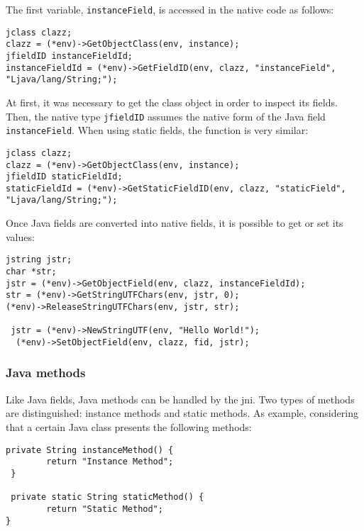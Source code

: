 The first variable, \texttt{instanceField}, is accessed in the native code as follows:

\begin{lstlisting}[caption=Accessing a Java instance field]
jclass clazz;
clazz = (*env)->GetObjectClass(env, instance);
jfieldID instanceFieldId;
instanceFieldId = (*env)->GetFieldID(env, clazz, "instanceField", "Ljava/lang/String;");
\end{lstlisting}

At first, it was necessary to get the class object in order to inspect its fields. Then, the native type \texttt{jfieldID} assumes the native form of the Java field \texttt{instanceField}.  When using static fields, the function is very similar:

\begin{lstlisting}[caption=Acessing a Java static field]
jclass clazz;
clazz = (*env)->GetObjectClass(env, instance);
jfieldID staticFieldId;
staticFieldId = (*env)->GetStaticFieldID(env, clazz, "staticField", "Ljava/lang/String;");
\end{lstlisting}

Once Java fields are converted into native fields, it is possible to get or set its values:

\begin{lstlisting}[caption=Getting and setting a Java instance field value]
jstring jstr;
char *str;
jstr = (*env)->GetObjectField(env, clazz, instanceFieldId);
str = (*env)->GetStringUTFChars(env, jstr, 0);
(*env)->ReleaseStringUTFChars(env, jstr, str);

 jstr = (*env)->NewStringUTF(env, "Hello World!");
  (*env)->SetObjectField(env, clazz, fid, jstr);
\end{lstlisting}


\subsubsection{Java methods}

Like Java fields, Java methods can be handled by the \gls{jni}. Two types of methods are distinguished: instance methods and static methods. As example, considering that a certain Java class presents the following methods:

\begin{lstlisting}[caption=Declaring Java methods]
private String instanceMethod() {
        return "Instance Method";
 }

 private static String staticMethod() {
        return "Static Method";
}
\end{lstlisting}

